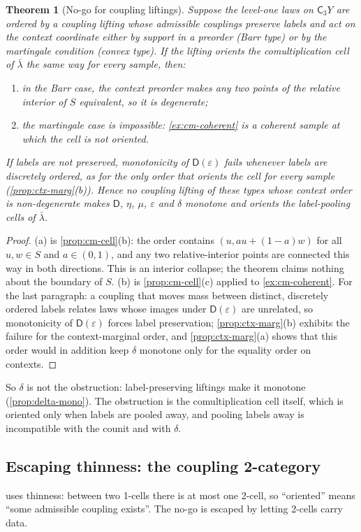 \documentclass[11pt]{article}
\newtheorem{theorem}{Theorem}[section]
\theoremstyle{definition}
\newcommand{\D}{\mathsf D}
\newcommand{\C}{\mathsf C}
\newcommand{\lb}{\bar\lambda}
\begin{document}
\begin{theorem}[No-go for coupling liftings]\label{thm:nogo}
Suppose the level-one laws on $\C_3Y$ are ordered by a coupling lifting whose admissible couplings preserve labels and act on the
context coordinate either by support in a preorder (Barr type) or by the martingale condition (convex type). If the lifting orients the
comultiplication cell of $\lb$ the same way for every sample, then:
\begin{enumerate}[label=(\alph*)]
\item in the Barr case, the context preorder makes any two points of the relative interior of $S$ equivalent, so it is degenerate;
\item the martingale case is impossible: \cref{ex:cm-coherent} is a coherent sample at which the cell is not oriented.
\end{enumerate}
If labels are not preserved, monotonicity of $\D(\varepsilon)$ fails whenever labels are discretely ordered, as for the only order that
orients the cell for every sample (\cref{prop:ctx-marg}(b)). Hence no coupling lifting of these types whose context order is
non-degenerate makes $\D$, $\eta$, $\mu$, $\varepsilon$ and $\delta$ monotone and orients the label-pooling cells of $\lb$.
\end{theorem}
\begin{proof}
(a) is \cref{prop:cm-cell}(b): the order contains $(u,au+(1-a)w)$ for all $u,w\in S$ and $a\in(0,1)$, and any two relative-interior points
are connected this way in both directions. This is an interior collapse; the theorem claims nothing about the boundary of $S$.
(b) is \cref{prop:cm-cell}(c) applied to \cref{ex:cm-coherent}. For the last paragraph: a coupling that moves mass between distinct,
discretely ordered labels relates laws whose images under $\D(\varepsilon)$ are unrelated, so monotonicity of $\D(\varepsilon)$ forces
label preservation; \cref{prop:ctx-marg}(b) exhibits the failure for the context-marginal order, and \cref{prop:ctx-marg}(a) shows that
this order would in addition keep $\delta$ monotone only for the equality order on contexts.
\end{proof}

So $\delta$ is not the obstruction: label-preserving liftings make it monotone (\cref{prop:delta-mono}). The obstruction is the
comultiplication cell itself, which is oriented only when labels are pooled away, and pooling labels away is incompatible with the
counit and with $\delta$.

\subsection{Escaping thinness: the coupling 2-category}\label{sec:coupling-2cat}
 uses thinness: between two 1-cells there is at most one 2-cell, so ``oriented'' means ``some admissible coupling
exists''. The no-go is escaped by letting 2-cells carry data.
\end{document}
